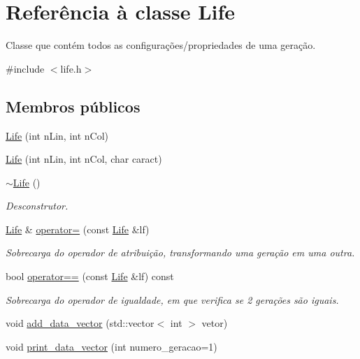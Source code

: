 \hypertarget{classLife}{}\section{Referência à classe Life}
\label{classLife}


Classe que contém todos as configurações/propriedades de uma geração.  




{\ttfamily \#include $<$life.\+h$>$}

\subsection*{Membros públicos}
\begin{DoxyCompactItemize}
\item 
\hyperlink{classLife_a9c54ff69842ec7e1f6195686abd48bfc}{Life} (int n\+Lin, int n\+Col)
\item 
\hyperlink{classLife_ab1c77136658b414aed166fb5746dd7ef}{Life} (int n\+Lin, int n\+Col, char caract)
\item 
\hyperlink{classLife_ac5a521e06906fb4f834001b2b4f7adc7}{$\sim$\+Life} ()
\begin{DoxyCompactList}\small\item\em Desconstrutor. \end{DoxyCompactList}\item 
\hyperlink{classLife}{Life} \& \hyperlink{classLife_a79902e1e85146df19fb2b920899a5a36}{operator=} (const \hyperlink{classLife}{Life} \&lf)
\begin{DoxyCompactList}\small\item\em Sobrecarga do operador de atribuição, transformando uma geração em uma outra. \end{DoxyCompactList}\item 
bool \hyperlink{classLife_a50ef5ca2efcc8053b8d54fad159722cb}{operator==} (const \hyperlink{classLife}{Life} \&lf) const
\begin{DoxyCompactList}\small\item\em Sobrecarga do operador de igualdade, em que verifica se 2 gerações são iguais. \end{DoxyCompactList}\item 
void \hyperlink{classLife_a4f2c49e28b51d83ea625b448ac5aa7bb}{add\+\_\+data\+\_\+vector} (std\+::vector$<$ int $>$ vetor)
\item 
void \hyperlink{classLife_ae6230a18db54107b46db859424ccd4c3}{print\+\_\+data\+\_\+vector} (int numero\+\_\+geracao=1)
\item 

\end{DoxyCompactItemize}
